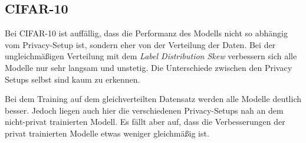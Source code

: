 \subsection{CIFAR-10}
Bei CIFAR-10 ist auffällig, dass die Performanz des Modells nicht so abhängig vom Privacy-Setup ist, sondern eher von der Verteilung der Daten. Bei der ungleichmäßigen Verteilung mit dem \textit{Label Distribution Skew} verbessern sich alle Modelle nur sehr langsam und unstetig. Die Unterschiede zwischen den Privacy Setups selbst sind kaum zu erkennen.

Bei dem Training auf dem gleichverteilten Datensatz werden alle Modelle deutlich besser. Jedoch liegen auch hier die verschiedenen Privacy-Setups nah an dem nicht-privat trainierten Modell. Es fällt aber auf, dass die Verbesserungen der privat trainierten Modelle etwas weniger gleichmäßig ist.



